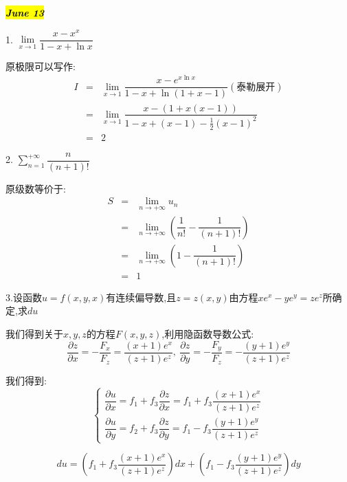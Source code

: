 
\hl{\textbf{\textit{June 13}}}

1. $\lim\limits_{x\rightarrow 1}\dfrac{x-x^{x}}{1-x+\ln x}$
\begin{solution}
	
	原极限可以写作: 
	\begin{eqnarray*}
		I&=&\lim\limits_{x\rightarrow 1}\dfrac{x-e^{x\ln x}}{1-x+\ln(1+x-1)}(\text{泰勒展开})\\
		&=&\lim\limits_{x\rightarrow 1}\dfrac{x-(1+x(x-1))}{1-x+(x-1)-\frac{1}{2}(x-1)^2}\\
		&=&2
	\end{eqnarray*}
\end{solution}


2. $\sum\limits_{n=1}^{+\infty}\dfrac{n}{(n+1)!}$
\begin{solution}
	
	原级数等价于: 
	\begin{eqnarray*}
		S&=&\lim\limits_{n\rightarrow+\infty}u_{n}\\
		&=&\lim\limits_{n\rightarrow+\infty}(\dfrac{1}{n!}-\dfrac{1}{(n+1)!})\\
		&=&\lim\limits_{n\rightarrow+\infty}(1-\dfrac{1}{(n+1)!})\\
		&=&1	
	\end{eqnarray*}
\end{solution}


3.设函数$u=f(x,y,x)$有连续偏导数,且$z=z(x,y)$由方程$xe^x-ye^y=ze^z$所确定,求$du$
\begin{solution}
	
	我们得到关于$x,y,z$的方程$F(x,y,z)$,利用隐函数导数公式: 
	$$\dfrac{\partial z}{\partial x}=-\dfrac{F_{x}}{F_{z}}=\dfrac{(x+1)e^x}{(z+1)e^z},\ \dfrac{\partial z}{\partial y}=-\dfrac{F_{y}}{F_{z}}=-\dfrac{(y+1)e^y}{(z+1)e^z}$$
	
	我们得到: 
	$$\left\lbrace 
	\begin{array}{l}
		\dfrac{\partial u}{\partial x}=f_{1}+f_{3}\dfrac{\partial z}{\partial x}=f_{1}+f_{3}\dfrac{(x+1)e^x}{(z+1)e^z}\\
		\dfrac{\partial u}{\partial y}=f_{2}+f_{3}\dfrac{\partial z}{\partial y}=f_{1}-f_{3}\dfrac{(y+1)e^y}{(z+1)e^z}
	\end{array}
	\right. $$
	
	$$du=(f_{1}+f_{3}\dfrac{(x+1)e^x}{(z+1)e^z})dx+(f_{1}-f_{3}\dfrac{(y+1)e^y}{(z+1)e^z})dy$$
\end{solution}

